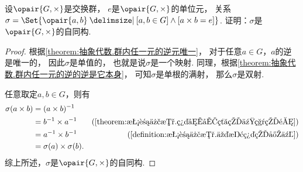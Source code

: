 \begin{example}
设\(\opair{G,\times}\)是交换群，
\(e\)是\(\opair{G,\times}\)的单位元，
关系\(\sigma=\Set{ \opair{a,b} \given [a,b\in G]\land[a\times b=e] }\).
证明：\(\sigma\)是\(\opair{G,\times}\)的自同构.
\begin{proof}
根据\cref{theorem:抽象代数.群内任一元的逆元唯一}，
对于任意\(a\in G\)，\(a\)的逆是唯一的，
因此\(\sigma\)是单值的，
也就是说\(\sigma\)是一个映射.
同理，根据\cref{theorem:抽象代数.群内任一元的逆的逆是它本身}，
可知\(\sigma\)是单根的满射，
那么\(\sigma\)是双射.

任意取定\(a,b\in G\)，则有
\begin{align*}
	\sigma(a \times b)
	&= (a \times b)^{-1} \\
	&= b^{-1} \times a^{-1}
		&(\text{\cref{theorem:抽象代数.群内元素的乘积的逆}}) \\
	&= a^{-1} \times b^{-1}
		&(\text{\cref{definition:抽象代数.交换群的定义}}) \\
	&= \sigma(a) \times \sigma(b).
\end{align*}
综上所述，\(\sigma\)是\(\opair{G,\times}\)的自同构.
\end{proof}
\end{example}

